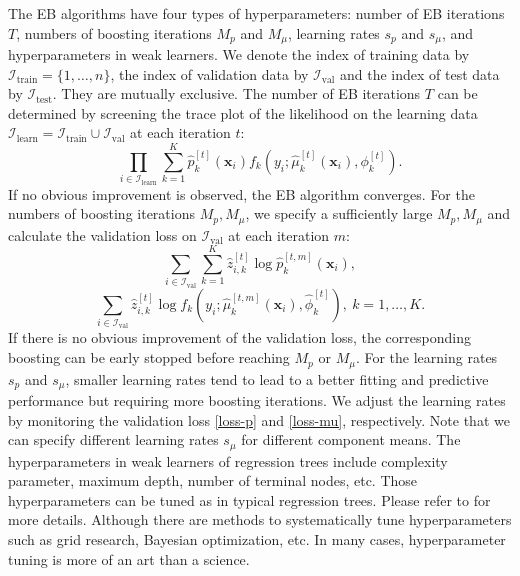 \documentclass[11pt]{article}
\numberwithin{equation}{section}
\def\bx{\boldsymbol{x}}
\begin{document}
The EB algorithms have four types of hyperparameters: number of EB iterations $T$, numbers of boosting iterations $M_p$ and $M_\mu$, learning rates $s_p$ and $s_\mu$, and hyperparameters in weak learners. 
We denote the index of training data by $\mathcal{I}_\text{train}=\{1,\ldots,n\}$, the index of validation data by $\mathcal{I}_\text{val}$ and the index of test data by $\mathcal{I}_\text{test}$. They are mutually exclusive.
The number of EB iterations $T$ can be determined by screening the trace plot of the likelihood on the learning data $\mathcal{I}_\text{learn}=\mathcal{I}_\text{train}\cup\mathcal{I}_\text{val}$ at each iteration $t$:
$$\prod_{i\in\mathcal{I}_\text{learn}}\sum_{k=1}^K\hat{p}_k^{[t]}(\bx_i)f_k(y_i;\hat{\mu}_k^{[t]}(\bx_i),\phi_k^{[t]}).$$
If no obvious improvement is observed, the EB algorithm converges.
For the numbers of boosting iterations  {$M_p,M_\mu$}, we specify a sufficiently large $M_p,M_\mu$ and calculate the validation loss on $\mathcal{I}_\text{val}$ at each iteration $m$:
\begin{equation}\label{loss-p}
\sum_{i\in\mathcal{I}_\text{val}}\sum_{k=1}^K \hat{z}_{i,k}^{[t]}\log \hat{p}_k^{[t,m]}(\bx_i),
\end{equation}
\begin{equation}\label{loss-mu}
\sum_{i\in\mathcal{I}_\text{val}} \hat{z}^{[t]}_{i,k}\log f_k\left(y_i;\hat{\mu}_k^{[t,m]}\left(\bx_i\right),\hat{\phi}_k^{[t]}\right), ~ k=1,\ldots,K.
\end{equation}
If there is no obvious improvement of the validation loss, the corresponding boosting can be early stopped before reaching $M_p$ or $M_\mu$.  
For the learning rates {$s_p$} and $s_\mu$, smaller learning rates tend to lead to a better fitting and predictive performance but requiring more boosting iterations.
We adjust the learning rates by monitoring the validation loss \eqref{loss-p} and \eqref{loss-mu}, respectively.
Note that we can specify different learning rates $s_\mu$ for different component means.
The hyperparameters in weak learners of regression trees include complexity parameter, maximum depth, number of terminal nodes, etc.
Those hyperparameters can be tuned as in typical regression trees. Please refer to \citet{hastie2009elements} for more details.
Although there are methods to systematically tune  hyperparameters such as grid research, Bayesian optimization, etc.
In many cases, hyperparameter tuning is more of an art than a science.
\end{document}
